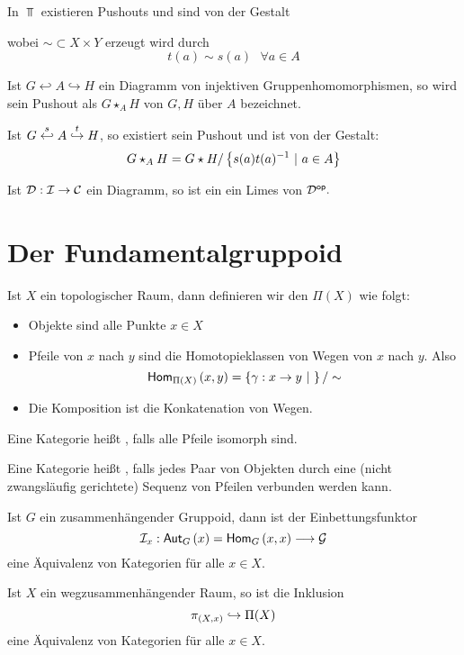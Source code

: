 In $\Top$ existieren Pushouts und sind von der Gestalt
\begin{center}
\end{center}
wobei $\sim \subset X \times Y$ erzeugt wird durch
\[t(a) \sim s(a) ~~~\forall a \in A \]

Ist $G \hookleftarrow A \hookrightarrow H$ ein Diagramm von injektiven Gruppenhomomorphismen, so wird sein Pushout als  $G\star_A H$ von $G, H$ über $A$ bezeichnet.

Ist $G \overset{s}{\hookleftarrow} A \overset{t}{\hookrightarrow} H$, so existiert sein Pushout und ist von der Gestalt:
\[G\star_A H = G\star H/\left\lbrace s(a)t(a)^{-1}~|~a \in A \right\rbrace\]

Ist $\mathcal{D} : \mathcal{I} \overset{}{\rightarrow} \mathcal{C}$ ein Diagramm, so ist ein  ein Limes von $\mathcal{D}^\textsf{op}.$


\section{Der Fundamentalgruppoid}
Ist $X$ ein topologischer Raum, dann definieren wir den  $\Pi(X)$ wie folgt:
\begin{itemize}
\item Objekte sind alle Punkte $x \in X$
\item Pfeile von $x$ nach $y$ sind die Homotopieklassen von Wegen von $x$ nach $y$. Also
\[\textsf{Hom}_{\Pi(X)}\left(x, y\right) = \left\lbrace \gamma : x \rightarrow y~|~ \right\rbrace/\sim\]
\item Die Komposition ist die Konkatenation von Wegen.
\end{itemize}


Eine Kategorie heißt , falls alle Pfeile isomorph sind.

Eine Kategorie heißt , falls jedes Paar von Objekten durch eine (nicht zwangsläufig gerichtete) Sequenz von Pfeilen verbunden werden kann.

Ist $G$ ein zusammenhängender Gruppoid, dann ist der Einbettungsfunktor
\[\mathcal{I}_x : \textsf{Aut}_{G}\left(x\right) = \textsf{Hom}_{G}\left(x, x\right) \longrightarrow \mathcal{G} \]
eine Äquivalenz von Kategorien für alle $x \in X$.

\Kor{}
Ist $X$ ein wegzusammenhängender Raum, so ist die Inklusion
\[\pi_{\left(X,x\right)} \overset{}{\hookrightarrow} \Pi(X) \]
eine Äquivalenz von Kategorien für alle $x \in X$.

